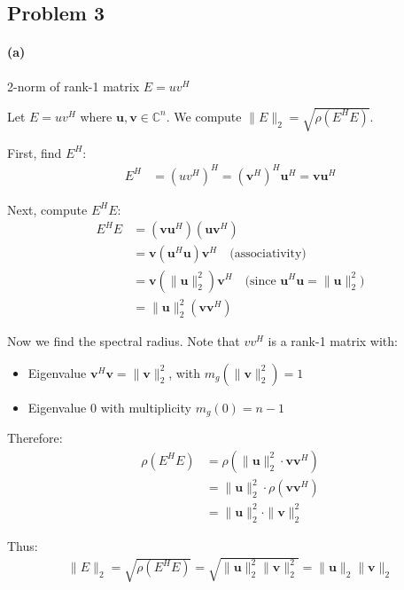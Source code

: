 \subsection{Problem 3}

\paragraph{(a)} 2-norm of rank-1 matrix $E = uv^H$

Let $E = uv^H$ where $\mathbf{u}, \mathbf{v} \in \mathbb{C}^n$. We compute $\|E\|_2 = \sqrt{\rho(E^H E)}$.

First, find $E^H$:
\begin{align*}
    E^H & = (uv^H)^H = (\mathbf{v}^H)^H \mathbf{u}^H = \mathbf{v} \mathbf{u}^H
\end{align*}

Next, compute $E^H E$:
\begin{align*}
    E^H E & = (\mathbf{v} \mathbf{u}^H)(\mathbf{u} \mathbf{v}^H)                                                                     \\
          & = \mathbf{v} (\mathbf{u}^H \mathbf{u}) \mathbf{v}^H \quad \text{(associativity)}                                         \\
          & = \mathbf{v} (\|\mathbf{u}\|_2^2) \mathbf{v}^H \quad \text{(since } \mathbf{u}^H \mathbf{u} = \|\mathbf{u}\|_2^2\text{)} \\
          & = \|\mathbf{u}\|_2^2 (\mathbf{v} \mathbf{v}^H)
\end{align*}

Now we find the spectral radius. Note that $vv^H$ is a rank-1 matrix with:
\begin{itemize}
    \item Eigenvalue $\mathbf{v}^H \mathbf{v} = \|\mathbf{v}\|_2^2$, with $m_g(\|\mathbf{v}\|_2^2) = 1$
    \item Eigenvalue $0$ with multiplicity $m_g(0) = n-1$
\end{itemize}

Therefore:
\begin{align*}
    \rho(E^H E) & = \rho(\|\mathbf{u}\|_2^2 \cdot \mathbf{v} \mathbf{v}^H) \\
                & = \|\mathbf{u}\|_2^2 \cdot \rho(\mathbf{v} \mathbf{v}^H) \\
                & = \|\mathbf{u}\|_2^2 \cdot \|\mathbf{v}\|_2^2
\end{align*}

Thus:
\begin{align*}
    \|E\|_2 = \sqrt{\rho(E^H E)} = \sqrt{\|\mathbf{u}\|_2^2 \|\mathbf{v}\|_2^2} = \|\mathbf{u}\|_2 \|\mathbf{v}\|_2
\end{align*}

